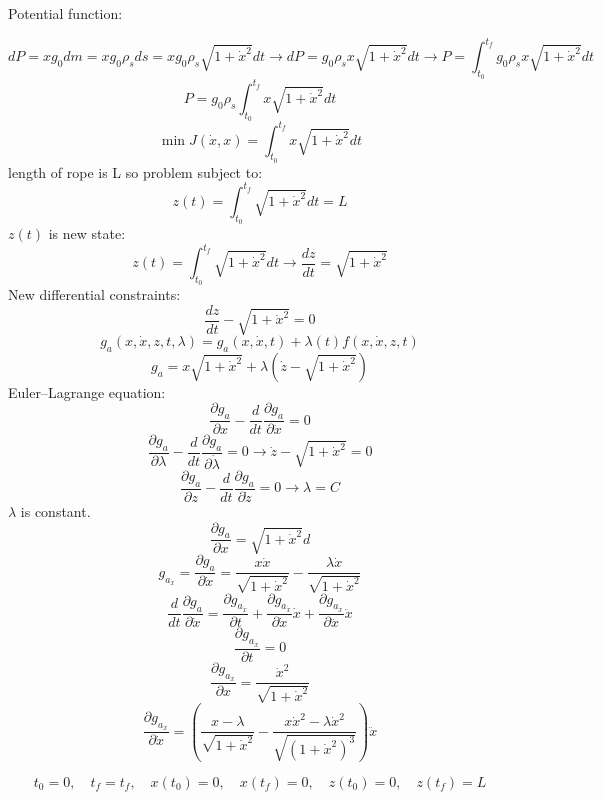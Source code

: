 Potential function:


$$dP = xg_0dm = xg_0\rho_s ds = xg_0\rho_s\sqrt{1+\dot{x}^2}dt
\to dP = g_0\rho_sx\sqrt{1+\dot{x}^2} dt\to P = \int_{t_0}^{t_f} g_0\rho_sx\sqrt{1+\dot{x}^2}dt
$$
$$P = g_0\rho_s\int_{t_0}^{t_f} x\sqrt{1+\dot{x}^2}dt$$
$$\min J(\dot{x}, x) = \int_{t_0}^{t_f} x\sqrt{1+\dot{x}^2}dt$$
length of rope is L so problem subject to:
$$z(t) = \int_{t_0}^{t_f} \sqrt{1+\dot{x}^2}dt = L$$ 
$z(t)$ is new state:
$$z(t) = \int_{t_0}^{t_f} \sqrt{1+\dot{x}^2}dt\to \dfrac{dz}{dt} =\sqrt{1+\dot{x}^2} $$
New differential constraints:
$$\dfrac{dz}{dt} - \sqrt{1+\dot{x}^2}  = 0$$
$$g_a(x, \dot x, z, t, \lambda) = g_a(x, \dot x, t) + \lambda(t)f(x, \dot x, z, t) $$
$$g_a = x\sqrt{1+\dot{x}^2} + \lambda (\dot z - \sqrt{1+\dot{x}^2})$$
Euler–Lagrange equation:
$$\dfrac{\partial g_a}{\partial x} - \dfrac{d}{dt}\dfrac{\partial g_a}{\partial \dot x} = 0$$
$$\dfrac{\partial g_a}{\partial \lambda} - \dfrac{d}{dt}\dfrac{\partial g_a}{\partial \dot \lambda} = 0 \to 
\dot z -  \sqrt{1+\dot{x}^2} = 0
$$
$$\dfrac{\partial g_a}{\partial z} - \dfrac{d}{dt}\dfrac{\partial g_a}{\partial \dot z} = 0 \to \lambda = C$$
$\lambda$ is constant.
$$\dfrac{\partial g_a}{\partial x} =  \sqrt{1+\dot{x}^2}d$$
$$g_{a_{\dot{x}}} = \dfrac{\partial g_a}{\partial \dot x} = \dfrac{x\dot x}{\sqrt{1+\dot x^2}}  - \dfrac{\lambda \dot x}{\sqrt{1+\dot x^2}} $$
$$\dfrac{d}{dt}\dfrac{\partial g_a}{\partial \dot x} = \dfrac{\partial g_{a_{\dot{x}}}}{\partial  t}+
\dfrac{\partial g_{a_{\dot{x}}}}{\partial \dot x}\dot x+
\dfrac{\partial g_{a_{\dot{x}}}}{\partial \ddot x} \ddot x
$$
$$\dfrac{\partial g_{a_{\dot{x}}}}{\partial t} = 0$$
$$\dfrac{\partial g_{a_{\dot{x}}}}{\partial x} =  \dfrac{ \dot x^2}{\sqrt{1+\dot x^2}}$$
$$\dfrac{\partial g_{a_{\dot{x}}}}{\partial \dot x} = (\dfrac{x - \lambda }{\sqrt{1+\dot x^2}}
- \dfrac{x\dot x^2 - \lambda \dot x^2}{\sqrt{(1+\dot x^2)^3}})\ddot x
$$


$$t_0 = 0,\quad t_f =t_f,\quad x(t_0) = 0,\quad x(t_f) = 0,\quad z(t_0) = 0,\quad z(t_f) = L$$



